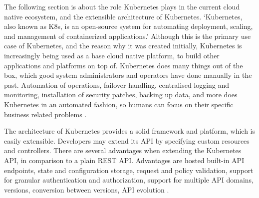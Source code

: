 The following section is about
the role Kubernetes plays in the current cloud native ecosystem,
and the extensible architecture of Kubernetes.
\enquote*{Kubernetes, also known as K8s, is an open-source system for automating deployment, scaling, and management of containerized applications.}
\autocite{kubernetesIoWebsite}
Although this is the primary use case of Kubernetes,
and the reason why it was created initially,
Kubernetes is increasingly being used as a base cloud native platform,
to build other applications and platforms on top of.
Kubernetes does many things out of the box,
which good system administrators and operators
have done manually in the past.
Automation of operations, failover handling, centralised logging and monitoring,
installation of security patches, backing up data, and more
does Kubernetes in an automated fashion,
so humans can focus on their specific business related problems
\autocite{cloudNativeDevopsMitKubernetesArundel2019cloud}.

The architecture of Kubernetes provides a solid framework and platform,
which is easily extensible.
Developers may extend its API by specifying custom resources and controllers.
There are several advantages when extending the Kubernetes API,
in comparison to a plain REST API.
Advantages are hosted built-in API endpoints, state and configuration storage,
request and policy validation,
support for granular authentication and authorization,
support for multiple API domains, versions, conversion between versions, API evolution
\autocite{kubebuilderBookWebsite}.
%

